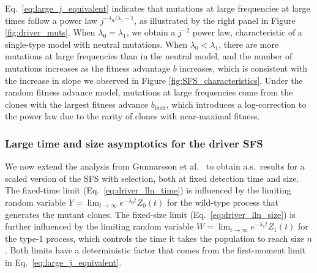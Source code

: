 \documentclass{article}
\numberwithin{equation}{section}
\begin{document}
Eq.~\ref{eq:large_j_equivalent} indicates that mutations at large frequencies at large times follow a power law $j^{-\lambda_0/\lambda_1-1}$, as illustrated by the right panel in Figure \ref{fig:driver_muts}.
When $\lambda_0=\lambda_1$, we obtain a $j^{-2}$ power law, characteristic of a single-type model with neutral mutations.
When $\lambda_0 < \lambda_1$, there are more mutations at large frequencies than in the neutral model, and the number of mutations increases as the fitness advantage $b$ increases, which is consistent with the increase in slope we observed in Figure \ref{fig:SFS_characteristics}.
Under the random fitness advance model, mutations at large frequencies come from the clones with the largest fitness advance $b_{\max}$, which introduces a log-correction to the power law due to the rarity of clones with near-maximal fitness. 

\subsubsection{Large time and size asymptotics for the driver SFS}\label{sec:lln_SFS}

We now extend the analysis from Gunnarsson et al.~\cite{gunnarsson2025} to obtain a.s.~results for a scaled version of the SFS with selection, both at fixed detection time and size. 
The fixed-time limit (Eq.~\ref{eq:driver_lln_time}) is influenced by the limiting random variable $Y = \lim_{t \to \infty} e^{-\lambda_0t} Z_0(t)$ for the wild-type process that generates the mutant clones.
The fixed-size limit (Eq.~\ref{eq:driver_lln_size}) is further influenced by the limiting random variable $W = \lim_{t \to \infty} e^{-\lambda_1t} Z_1(t)$ for the type-1 process, which controls the time it takes the population to reach size $n$.
Both limits have a deterministic factor that comes from the first-moment limit in Eq.~\ref{eq:large_j_equivalent}.
\end{document}
